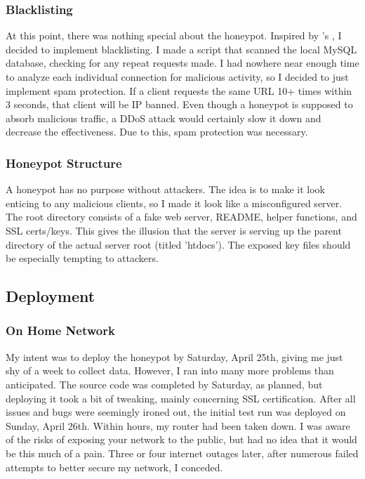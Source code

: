\documentclass[12pt]{article}
\begin{document}
\subsubsection{Blacklisting}
At this point, there was nothing special about the honeypot.
Inspired by \textcite{stackhoneypot}'s , I decided to implement blacklisting.
I made a script that scanned the local MySQL database, checking for any repeat requests made.
I had nowhere near enough time to analyze each individual connection for malicious activity, so I decided to just implement spam protection.
If a client requests the same URL 10+ times within 3 seconds, that client will be IP banned.
Even though a honeypot is supposed to absorb malicious traffic, a DDoS attack would certainly slow it down and decrease the effectiveness.
Due to this, spam protection was necessary.

\subsubsection{Honeypot Structure}
A honeypot has no purpose without attackers.
The idea is to make it look enticing to any malicious clients, so I made it look like a misconfigured server.
The root directory consists of a fake web server, README, helper functions, and SSL certs/keys.
This gives the illusion that the server is serving up the parent directory of the actual server root (titled 'htdocs').
The exposed key files should be especially tempting to attackers.

\subsection{Deployment}

\subsubsection{On Home Network}
My intent was to deploy the honeypot by Saturday, April 25th, giving me just shy of a week to collect data.
However, I ran into many more problems than anticipated.
The source code was completed by Saturday, as planned, but deploying it took a bit of tweaking, mainly concerning SSL certification.
After all issues and bugs were seemingly ironed out, the initial test run was deployed on Sunday, April 26th.
Within hours, my router had been taken down.
I was aware of the risks of exposing your network to the public, but had no idea that it would be this much of a pain.
Three or four internet outages later, after numerous failed attempts to better secure my network, I conceded.
\end{document}
